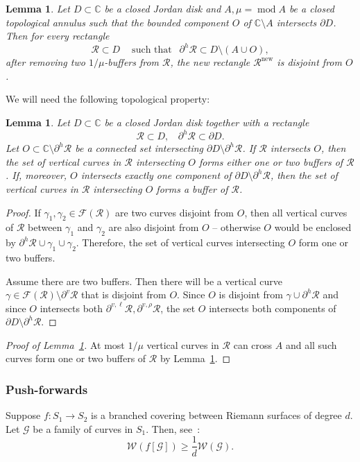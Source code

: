 \documentclass{amsart}
\renewcommand{\sp}{{\ \ }}
\newcommand{\1}{{\mathbb 1 }}
\newcommand{\FamG}{{\mathcal G}}
\newcommand{\Fam}{{\mathcal F}}
\newcommand{\Width}{{\mathcal W}}
\newcommand\RR{\mathcal{R}}
\newcommand\new{{\operatorname{new}}}
\newcommand{\C}{\mathbb{C}}
\newtheorem{lem}[thm]{Lemma}
\theoremstyle{remark}
\numberwithin{equation}{section}
\theoremstyle{definition}
\renewcommand{\mod}{\operatorname{mod}}
\begin{document}
\begin{lem} 
\label{lem:Rect in U} Let $D\subset \C$ be a closed Jordan disk and $A,\mu=\mod A$ be a closed topological annulus such that the bounded component $O$ of $\C\setminus A$ intersects $\partial D$. Then for every rectangle \[\RR\subset D\sp\sp \text{ such that }\sp \partial ^h \RR \subset D\setminus (A\cup O), \] after removing two $1/\mu$-buffers from $\RR$, the new rectangle $\RR^\new$ is disjoint from $O$.
\end{lem}

We will need the following topological property:

\begin{lem}
\label{lem:buffer:R O}
Let $D\subset \C$ be a closed Jordan disk together with a rectangle
\[\RR\subset  D,\sp\sp \partial^h \RR\subset \partial D. \]
Let $O\subset \C\setminus \partial^h\RR $ be a connected set intersecting $\partial D\setminus \partial ^h \RR$. If $\RR$ intersects $O$, then the set of vertical curves in $\RR$ intersecting $O$ forms either one or two buffers of $\RR$. If, moreover, $O$ intersects exactly one component of $\partial D\setminus \partial ^h \RR$, then the set of vertical curves in $\RR$ intersecting $O$ forms a buffer of $\RR$.
\end{lem}
\begin{proof}
If $\gamma_1,\gamma_2\in \Fam(\RR)$ are two curves disjoint from $O$, then all vertical curves of $\RR$ between $\gamma_1$ and $\gamma_2$ are also disjoint from $O$ -- otherwise $O$ would be enclosed by $\partial^h \RR\cup \gamma_1\cup \gamma_2$. Therefore, the set of vertical curves intersecting $O$ form one or two buffers. 

Assume there are two buffers. Then there will be a vertical curve $\gamma\in\Fam(\RR)\setminus \partial^{v} \RR$ that is disjoint from $O$. Since $O$ is disjoint from $ \gamma\cup \partial ^h \RR$ and since $O$ intersects both $\partial^{v,\ell} \RR, \partial^{v,\rho} \RR$, the set $O$ intersects both components of $\partial D\setminus \partial ^h \RR$.
\end{proof}
\begin{proof}[Proof of Lemma~\ref{lem:Rect in U}]
 At most $1/\mu$ vertical curves in $\RR$ can cross $A$ and all such curves form one or two buffers of $\RR$ by Lemma~\ref{lem:buffer:R O}. 
\end{proof}



\subsubsection{Push-forwards} Suppose $f\colon S_1\to S_2$ is a branched covering between Riemann surfaces of degree $d$. Let $\FamG$ be a family of curves in $S_1$. Then, see~\cite[Lemma 4.3]{KL}: 
\begin{equation}
\label{eq:Width:degree d}\Width(f[\FamG])\ge \frac 1 d \Width(\FamG).
\end{equation}
\end{document}
